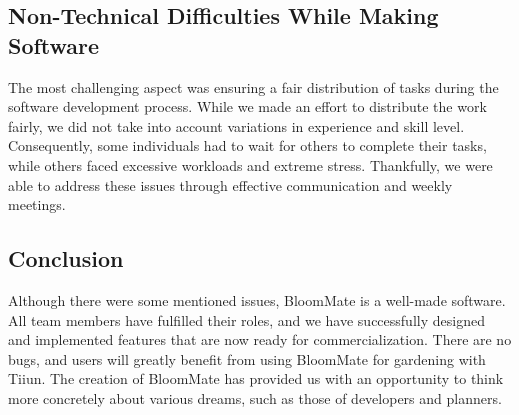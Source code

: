 \documentclass[conference, a4paper]{IEEEtran}
\begin{document}
\subsection{Non-Technical Difficulties While Making Software}
The most challenging aspect was ensuring a fair distribution of tasks during the software development process. While we made an effort to distribute the work fairly, we did not take into account variations in experience and skill level. Consequently, some individuals had to wait for others to complete their tasks, while others faced excessive workloads and extreme stress. Thankfully, we were able to address these issues through effective communication and weekly meetings. \\

\subsection{Conclusion}
Although there were some mentioned issues, BloomMate is a well-made software. All team members have fulfilled their roles, and we have successfully designed and implemented features that are now ready for commercialization. There are no bugs, and users will greatly benefit from using BloomMate for gardening with Tiiun. The creation of BloomMate has provided us with an opportunity to think more concretely about various dreams, such as those of developers and planners. \\



\end{document}

